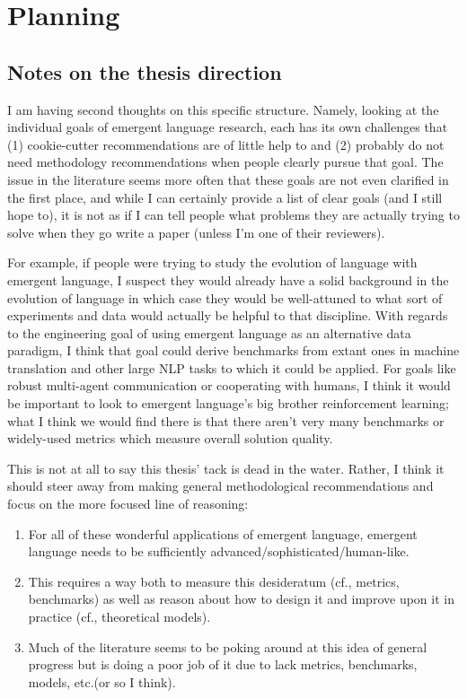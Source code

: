 \setcounter{chapter}{-1}
\chapter{Planning}


\section{Notes on the thesis direction}
I am having second thoughts on this  specific structure.
Namely, looking at the individual goals of emergent language research, each has its own challenges that (1) cookie-cutter recommendations are of little help to and (2) probably do not need methodology recommendations when people clearly pursue that goal.
The issue in the literature seems more often that these goals are not even clarified in the first place, and while I can certainly provide a list of clear goals (and I still hope to), it is not as if I can tell people what problems they are actually trying to solve when they go write a paper (unless I'm one of their reviewers).

For example, if people were trying to study the evolution of language with emergent language, I suspect they would already have a solid background in the evolution of language in which case they would be well-attuned to what sort of experiments and data would actually be helpful to that discipline.
With regards to the engineering goal of using emergent language as an alternative data paradigm, I think that goal could derive benchmarks from extant ones in machine translation and other large NLP tasks to which it could be applied.
For goals like robust multi-agent communication or cooperating with humans, I think it would be important to look to emergent language's big brother reinforcement learning; what I think we would find there is that there aren't very many benchmarks or widely-used metrics which measure overall solution quality.

This is not at all to say this thesis' tack is dead in the water.
Rather, I think it should steer away from making general methodological recommendations and focus on the more focused line of reasoning:
\begin{enumerate}
    \item For all of these wonderful applications of emergent language, emergent language needs to be sufficiently advanced/sophisticated/human-like.
    \item This requires a way both to measure this desideratum (cf., metrics, benchmarks) as well as reason about how to design it and improve upon it in practice (cf., theoretical models).
    \item Much of the literature seems to be poking around at this idea of general progress but is doing a poor job of it due to lack metrics, benchmarks, models, etc.\@ (or so I think).
\end{enumerate}



